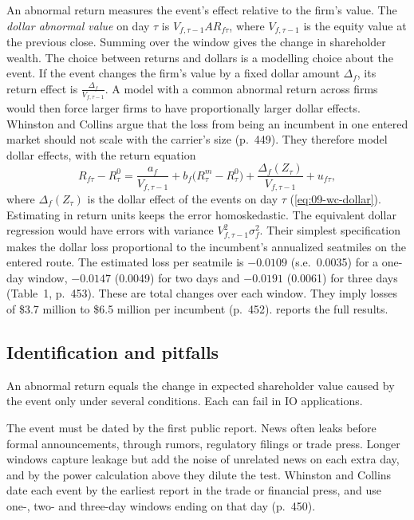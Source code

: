 An abnormal return measures the event's effect relative to the firm's value. The \emph{dollar abnormal value} on day
$\tau$ is $V_{f,\tau-1}AR_{f\tau}$, where $V_{f,\tau-1}$ is the equity value at the previous close. Summing over the
window gives the change in shareholder wealth. The choice between returns and dollars is a modelling choice about the
event. If the event changes the firm's value by a fixed dollar amount $\Delta_f$, its return effect is
$\frac{\Delta_f}{V_{f,\tau-1}}$. A model with a common abnormal return across firms would then force larger firms
to have proportionally larger dollar effects. Whinston and Collins argue that the loss from being an incumbent in one
entered market should not scale with the carrier's size (p.~449). They therefore model dollar effects, with the
return equation
\begin{equation*}
R_{f\tau}-R^0_\tau=\frac{a_f}{V_{f,\tau-1}}+b_f\big(R^m_\tau-R^0_\tau\big)+\frac{\Delta_f(Z_\tau)}{V_{f,\tau-1}}+u_{f\tau},
\end{equation*}
where $\Delta_f(Z_\tau)$ is the dollar effect of the events on day $\tau$ (\cref{eq:09-wc-dollar}). Estimating in
return units keeps the error homoskedastic. The equivalent dollar regression would have errors with variance
$V_{f,\tau-1}^2\sigma_f^2$. Their simplest specification makes the dollar loss proportional to the incumbent's
annualized seatmiles on the entered route. The estimated loss per seatmile is $-0.0109$ (s.e.\ 0.0035) for a one-day
window, $-0.0147$ (0.0049) for two days and $-0.0191$ (0.0061) for three days (Table~1, p.~453). These are total
changes over each window. They imply losses of \$3.7 million to \$6.5 million per incumbent (p.~452). 
reports the full results.

\subsection{Identification and pitfalls}\label{sec:A-es-pitfalls}

An abnormal return equals the change in expected shareholder value caused by the event only under several
conditions. Each can fail in IO applications.

The event must be dated by the first public report. News often leaks before formal announcements, through
rumors, regulatory filings or trade press. Longer windows capture leakage but add the noise of unrelated news on each
extra day, and by the power calculation above they dilute the test. Whinston and Collins date each event by the
earliest report in the trade or financial press, and use one-, two- and three-day windows ending on that day
(p.~450).

